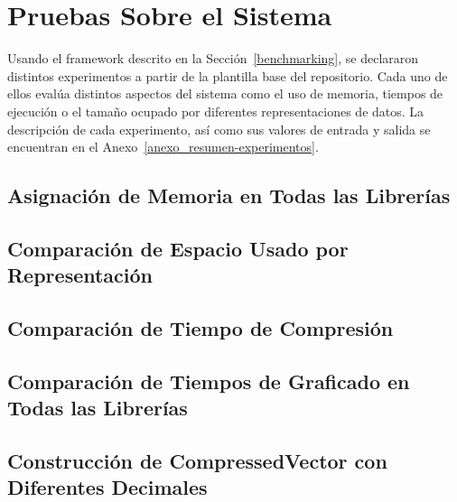 \section{Pruebas Sobre el Sistema}
\label{sec:pruebas-sistema}

Usando el framework descrito en la Sección~\ref{benchmarking}, se declararon distintos experimentos a partir de la plantilla base del repositorio. Cada uno de ellos evalúa distintos aspectos del sistema como el uso de memoria, tiempos de ejecución o el tamaño ocupado por diferentes representaciones de datos. La descripción de cada experimento, así como sus valores de entrada y salida se encuentran en el Anexo~\ref{anexo_resumen-experimentos}.
















\subsection{Asignación de Memoria en Todas las Librerías}
\label{exp:all-libs-mem}

\subsection{Comparación de Espacio Usado por Representación}
\label{exp:space-comparison}

\subsection{Comparación de Tiempo de Compresión}
\label{exp:compression-time}

\subsection{Comparación de Tiempos de Graficado en Todas las Librerías}
\label{exp:all-libs-time}

\subsection{Construcción de CompressedVector con Diferentes Decimales}
\label{exp:cvd-build-decimals}

